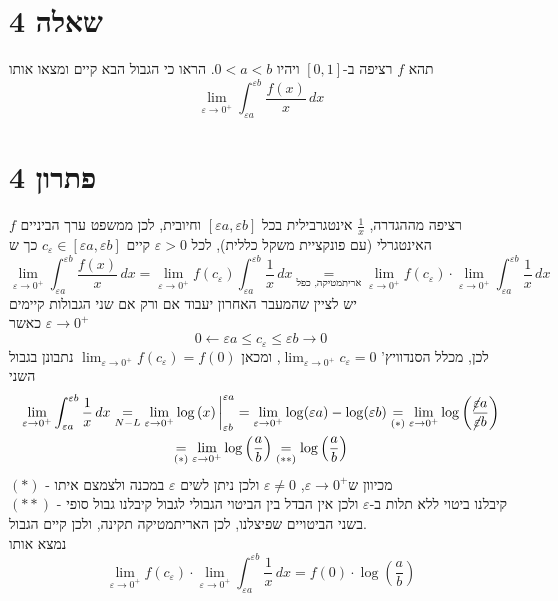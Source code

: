 \documentclass[12pt, titlepage]{article}
\begin{document}
\part*{שאלה 4}
תהא $f$ רציפה ב-$\left[0,1\right]$ ויהיו $0 < a < b$. הראו כי הגבול הבא קיים ומצאו אותו
\[
	\lim_{\varepsilon \to 0^+} \int^{\varepsilon b}_{\varepsilon a} \frac{f\left(x\right)}{x}\,dx
\]
\part*{פתרון 4}
$f$ רציפה מההגדרה, $\frac{1}{x}$ אינטגרבילית בכל $\left[\varepsilon a,\varepsilon b\right]$ וחיובית, לכן ממשפט ערך הביניים האינטגרלי (עם פונקציית משקל כללית), לכל $\varepsilon > 0$ קיים $c_\varepsilon \in \left[\varepsilon a, \varepsilon b\right]$ כך ש
\[
 \lim_{\varepsilon \to 0^+} \int_{\varepsilon a}^{\varepsilon b} \frac{f(x)}{x}  \,dx =\lim_{\varepsilon \to 0^+} f\left(c_\varepsilon\right) \int_{\varepsilon a}^{\varepsilon b} \frac{1}{x}\,dx \underset{\text{אריתמטיקה, כפל}}{=} \lim_{\varepsilon\to0^+} f \left( c_{\varepsilon} \right) \cdot \lim_{\varepsilon \to 0^+} \int_{\varepsilon a}^{\varepsilon b} \frac{1}{x}\,dx
\]
יש לציין שהמעבר האחרון יעבוד אם ורק אם שני הגבולות קיימים\\
כאשר $\varepsilon \to 0^+$
\[
    0\leftarrow \varepsilon a \leq c_\varepsilon \leq \varepsilon b \to 0
\]
לכן, מכלל הסנדוויץ' $\lim_{\varepsilon\to0^+} c_\varepsilon = 0$, ומכאן $\lim_{\varepsilon\to0^+} f\left(c_\varepsilon\right) = f\left(0\right)$
נתבונן בגבול השני
\begin{gather*}
    \lim_{\varepsilon \to 0^+} \int_{\varepsilon a}^{\varepsilon b} \frac{1}{x}\,dx \underset{N-L}{=} \lim_{\varepsilon \to 0^+} \log\left(x\right)\bigg{|}^{\varepsilon a}_{\varepsilon b} =\lim_{\varepsilon \to 0^+} \log(\varepsilon a )- \log(\varepsilon b)  \underset{\left(*\right)}{=}\lim_{\varepsilon \to 0^+} \log\left(\frac{\cancel{\varepsilon} a}{\cancel{\varepsilon} b}\right) \\
        \underset{\left(*\right)}{=} \lim_{\varepsilon \to 0^+} \log\left(\frac{a}{b}\right) \underset{\left(**\right)}{=} \log \left(\frac{a}{b}\right)
\end{gather*}
$\left(*\right)$ - מכיוון ש$\varepsilon \to 0^+$, $\varepsilon \neq 0$ ולכן ניתן לשים $\varepsilon$ במכנה ולצמצם איתו\\
$\left(**\right)$ - קיבלנו ביטוי ללא תלות ב-$\varepsilon$ ולכן אין הבדל בין הביטוי הגבולי לגבול
קיבלנו גבול סופי בשני הביטויים שפיצלנו, לכן האריתמטיקה תקינה, ולכן קיים הגבול.\\
נמצא אותו
\[
\lim_{\varepsilon\to0^+} f \left( c_{\varepsilon} \right) \cdot \lim_{\varepsilon \to 0^+} \int_{\varepsilon a}^{\varepsilon b} \frac{1}{x}\,dx =\boxed{ f\left(0\right) \cdot \log\left(\frac{a}{b}\right)}
\]
\newpage
\end{document}
